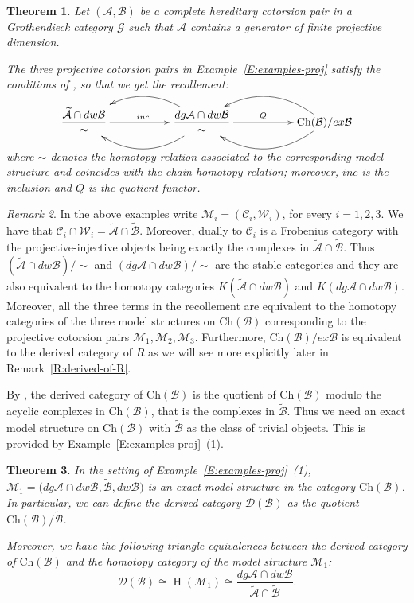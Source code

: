 \documentclass[11pt,a4paper,reqno]{amsart}
\newcommand{\ho}{\operatorname{H}}
\newcommand{\A}{\mathcal{A}}
\newcommand{\B}{\mathcal{B}}
\newcommand{\C}{\mathcal{C}}
\newcommand{\D}{\mathcal{D}}
\newcommand{\G}{\mathcal{G}}
\newcommand{\M}{\mathcal{M}}
\newcommand{\W}{\mathcal{W}}
\newcommand{\Ch}{\mathrm{Ch}}
\theoremstyle{plain}
\newtheorem{thm}{Theorem}[section]
\theoremstyle{definition}
\theoremstyle{remark}
\newtheorem{rem}[thm]{Remark}
\begin{document}
\begin{thm}\label{T:recollement-proj} Let $(\A, \B)$ be a complete hereditary cotorsion pair in a  Grothendieck category $\G$ such that $\A$ contains a generator of finite projective dimension.

The three projective cotorsion pairs in Example~\ref{E:examples-proj} satisfy the conditions of \cite[Theorem 3.5]{G7}, so that we get the recollement:

%
%
%
%
%
%
%
%
%
\[
\xymatrix{\dfrac{\widetilde{\A}\cap dw \B}{\sim} \ar[rr]^{inc} &&\dfrac{dg{\A}\cap dw \B}{\sim} \ar@/^2pc/
[ll]\ar@/_2pc/[ll] \ar[rr]^{Q}
&&{\Ch(\B)/ex\B}\ar@/^2pc/ [ll] \ar@/_2pc/ [ll] }
\]
\vskip 0.7cm

where $\sim$ denotes the homotopy relation associated to the corresponding model structure and coincides with the chain homotopy relation; moreover, $inc$ is the inclusion and $Q$ is the quotient functor.
\end{thm}
%
%
%
%
\begin{rem}\label{R:proj-recoll} In the above examples write $\M_i=(\C_i, \W_i)$, for every $i=1,2,3$.  We have that $\C_i\cap\W_i=\widetilde{\A}\cap\widetilde{\B}$. Moreover, dually to \cite[Proposition 3.2]{G7} $\C_i$ is a Frobenius category with the projective-injective objects being exactly the complexes in $\widetilde{\A}\cap\widetilde{\B}$. Thus $(\widetilde{\A}\cap dw\B)/\sim$ and $(dg{\A}\cap dw\B)/\sim$ are the stable categories and they are also equivalent to the homotopy categories $K(\widetilde{\A}\cap dw \B)$ and $K(dg{\A}\cap dw \B)$. Moreover,  all the three terms in the recollement are equivalent to the homotopy categories of the three model structures on $\Ch(\B)$ corresponding to the projective cotorsion pairs $\M_1, \M_2, \M_3$. Furthermore, $\Ch(\B)/ex\B$ is equivalent to the derived category of $R$ as we will see more explicitly later in Remark~\ref{R:derived-of-R}.
\end{rem}
\vskip 0.5cm
By \cite{Nee90}, the derived category of $\Ch(\B)$ is the quotient of $\Ch(\B)$ modulo the acyclic complexes in  $\Ch(\B)$, that is the complexes in $\widetilde{\B}$. Thus we need an exact model structure on $\Ch(\B)$ with $\widetilde{\B}$ as the class of trivial objects. This is provided by Example~\ref{E:examples-proj}~(1).
%
\begin{thm}\label{T:derived-B} In the setting of Example~\ref{E:examples-proj}~(1), $\M_1=\Big(dg{\A}\cap dw \B, \widetilde{\B}, dw\B\Big)$ is an exact model structure in the category $\Ch(\B)$.
 In particular, we can define the derived category $\D(\B)$ as the quotient  $\Ch(\B)/\widetilde{\B}$.

 Moreover, we have the following triangle equivalences between the derived category of $\Ch(\B)$ and the homotopy category of the model structure $\M_1$:
 \[\D(\B)\cong\ho(\M_1)\cong \dfrac{dg{\A}\cap dw \B}{\widetilde{\A}\cap\widetilde{\B}}.\]
 \end{thm}
\end{document}
